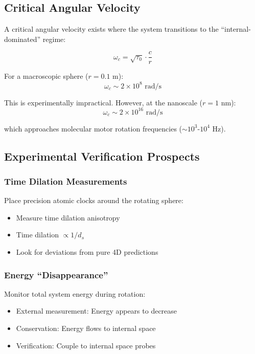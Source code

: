 \subsection{Critical Angular Velocity}

A critical angular velocity exists where the system transitions to the ``internal-dominated'' regime:

\begin{equation}
    \omega_c = \sqrt{\tau_0} \cdot \frac{c}{r}
    \label{eq:critical_omega}
\end{equation}

For a macroscopic sphere ($r = 0.1$ m):
\begin{equation}
    \omega_c \sim 2 \times 10^8 \text{ rad/s}
\end{equation}

This is experimentally impractical. However, at the nanoscale ($r = 1$ nm):
\begin{equation}
    \omega_c \sim 2 \times 10^{16} \text{ rad/s}
\end{equation}

which approaches molecular motor rotation frequencies ($\sim 10^3$-$10^4$ Hz).

\subsection{Experimental Verification Prospects}

\subsubsection{Time Dilation Measurements}

Place precision atomic clocks around the rotating sphere:
\begin{itemize}
    \item Measure time dilation anisotropy
    \item Time dilation $\propto 1/d_s$
    \item Look for deviations from pure 4D predictions
\end{itemize}

\subsubsection{Energy ``Disappearance''}

Monitor total system energy during rotation:
\begin{itemize}
    \item External measurement: Energy appears to decrease
    \item Conservation: Energy flows to internal space
    \item Verification: Couple to internal space probes
\end{itemize}

